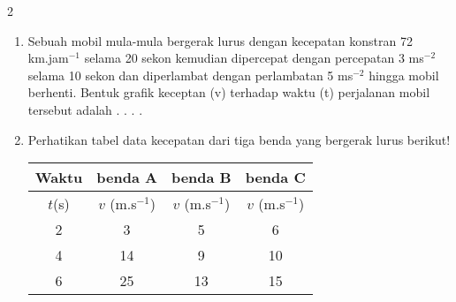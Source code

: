 \documentclass[10pt,a4paper]{article}
\begin{document}
\begin{multicols*} {2}
\begin{enumerate}[itemsep=0mm]
\item Sebuah mobil mula-mula bergerak lurus dengan kecepatan konstran 72 km.jam$^{-1}$ selama 20 sekon kemudian dipercepat dengan percepatan 3 ms$^{-2}$ selama 10 sekon dan diperlambat dengan perlambatan 5 ms$^{-2}$ hingga mobil berhenti. Bentuk grafik keceptan (v) terhadap waktu (t) perjalanan mobil tersebut adalah . . . . 

\item Perhatikan tabel data kecepatan dari tiga benda yang bergerak lurus berikut! 
\renewcommand\arraystretch{1}

\begin{tabular}{|c|c|c|c|}
\hline 
Waktu & benda A & benda B & benda C \\ \hline 
$t$(s) & $v$ (m.s$^{-1}$) &  $v$ (m.s$^{-1}$) &  $v$ (m.s$^{-1}$) \\ \hline
2 & 3 & 5 & 6 \\ \hline
4 & 14 & 9 & 10 \\ \hline
6 & 25 & 13 & 15 \\ \hline

\end{tabular}
\end{enumerate}    

\end{multicols*}
 \vspace{1cm}




 
\end{document}
